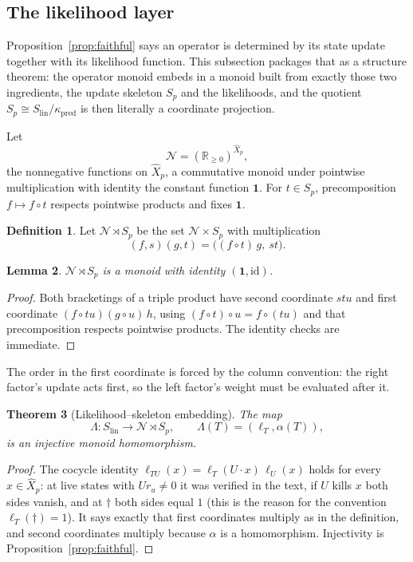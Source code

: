 \documentclass[10pt]{article}
\newtheorem{theorem}{Theorem}[section]
\newtheorem{lemma}[theorem]{Lemma}
\theoremstyle{definition}
\newtheorem{definition}[theorem]{Definition}
\theoremstyle{remark}
\newcommand{\R}{\mathbb{R}}
\newcommand{\id}{\mathrm{id}}
\begin{document}
\subsection{The likelihood layer}
\label{subsec:likelihood}

Proposition~\ref{prop:faithful} says an operator is determined by its
state update together with its likelihood function.  This subsection
packages that as a structure theorem: the operator monoid embeds in a
monoid built from exactly those two ingredients, the update skeleton
$S_p$ and the likelihoods, and the quotient
$S_p\cong S_{\mathrm{lin}}/\kappa_{\mathrm{pred}}$ is then literally a
coordinate projection.

Let
\[
  \mathcal N=(\R_{\ge0})^{\widehat X_p},
\]
the nonnegative functions on $\widehat X_p$, a commutative monoid under
pointwise multiplication with identity the constant function
$\mathbf 1$.  For $t\in S_p$, precomposition $f\mapsto f\circ t$
respects pointwise products and fixes $\mathbf 1$.

\begin{definition}
Let $\mathcal N\rtimes S_p$ be the set $\mathcal N\times S_p$ with
multiplication
\[
  (f,s)(g,t)=\bigl((f\circ t)\,g,\ st\bigr).
\]
\end{definition}

\begin{lemma}
$\mathcal N\rtimes S_p$ is a monoid with identity $(\mathbf 1,\id)$.
\end{lemma}

\begin{proof}
Both bracketings of a triple product have second coordinate $stu$ and
first coordinate $(f\circ tu)(g\circ u)\,h$, using
$(f\circ t)\circ u=f\circ(tu)$ and that precomposition respects
pointwise products.  The identity checks are immediate.
\end{proof}

The order in the first coordinate is forced by the column convention:
the right factor's update acts first, so the left factor's weight must
be evaluated after it.

\begin{theorem}[Likelihood--skeleton embedding]
\label{thm:semidirect}
The map
\[
  \Lambda:S_{\mathrm{lin}}\longrightarrow\mathcal N\rtimes S_p,
  \qquad
  \Lambda(T)=(\ell_T,\alpha(T)),
\]
is an injective monoid homomorphism.
\end{theorem}

\begin{proof}
The cocycle identity $\ell_{TU}(x)=\ell_T(U\cdot x)\,\ell_U(x)$ holds
for every $x\in\widehat X_p$: at live states with $Ur_u\ne0$ it was
verified in the text, if $U$ kills $x$ both sides vanish, and at
$\dagger$ both sides equal $1$ (this is the reason for the convention
$\ell_T(\dagger)=1$).  It says exactly that first coordinates multiply
as in the definition, and second coordinates multiply because $\alpha$
is a homomorphism.  Injectivity is
Proposition~\ref{prop:faithful}.
\end{proof}
\end{document}
